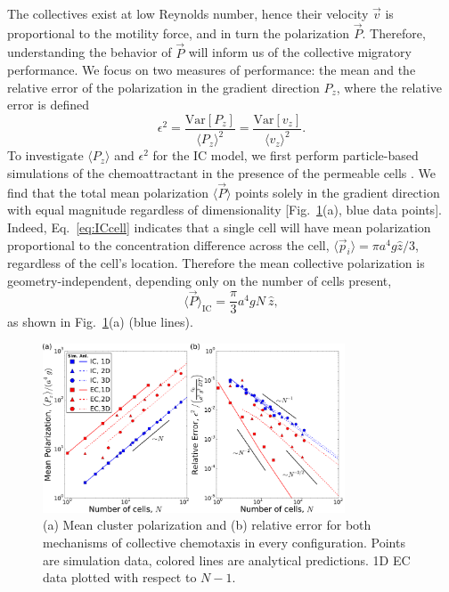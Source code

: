 The collectives exist at low Reynolds number, hence their velocity $\vec{v}$ is proportional to the motility force, and in turn the polarization $\vec{P}$.
Therefore, understanding the behavior of $\vec{P}$ will inform us of the collective migratory performance. We focus on two measures of performance: the mean and the relative error of the polarization in the gradient direction $P_z$, where the relative error is defined
\begin{equation} \label{eq:error1}
    \epsilon^2
    = \frac{\text{Var}[P_z]}{\langle P_z \rangle^2}
    = \frac{\text{Var}[v_z]}{\langle v_z \rangle^2}.
\end{equation}
To investigate $\langle P_z\rangle$ and $\epsilon^2$ for the IC model,
we first perform particle-based simulations of the chemoattractant in the presence of the permeable cells \cite{supinfo,ch3code}. We find that the total mean polarization $\langle \vec{P} \rangle$ points solely in the gradient direction with equal magnitude regardless of dimensionality [Fig.\ \ref{fig:2}(a), blue data points]. Indeed, Eq.\ \ref{eq:ICcell} indicates that a single cell will have mean polarization proportional to the concentration difference across the cell,
$\langle \vec{p}_i \rangle = \pi a^4g \hat{z}/3$,
regardless of the cell's location.
Therefore the mean collective polarization is geometry-independent, depending only on the number of cells present,
\begin{equation} \label{eq:ICmean}
    \langle \vec{P} \rangle_\text{IC} = \frac{\pi}{3} a^4gN \ \hat{z},
\end{equation}
as shown in Fig.\ \ref{fig:2}(a) (blue lines).

\begin{figure}[ht]
    \centering
        \includegraphics[width=0.8\textwidth]{../fig/ch3_fig2.pdf}
    \caption{(a) Mean cluster polarization and (b) relative error for both mechanisms of collective chemotaxis in every configuration. Points are simulation data, colored lines are analytical predictions. 1D EC data plotted with respect to $N-1$.} \label{fig:2}
\end{figure}

